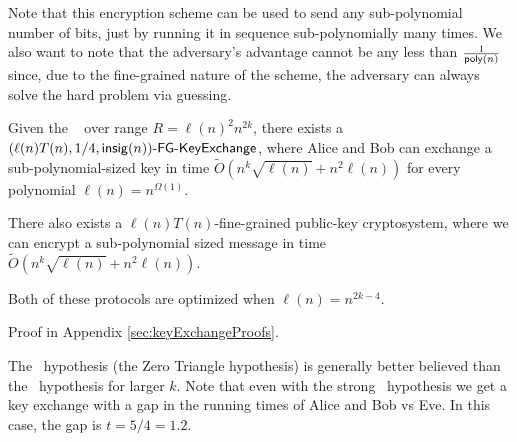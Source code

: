 Note that this encryption scheme can be used to send any sub-polynomial number of bits, just by running it in sequence sub-polynomially many times. %
 We also want to note that the adversary's advantage cannot be any less than $\frac{1}{ \mathsf{poly}(n)}$ since, due to the fine-grained nature of the scheme, the adversary can always solve the hard problem via guessing.


\begin{corollary}
	Given the \strongzkc~ over range $R = \ell(n)^2 n^{2k}$, there exists a\\ $(\ell(n)T(n), 1/4, \mathsf{insig}(n))\textsf{-FG-KeyExchange}$, where Alice and Bob can exchange a sub-polynomial-sized key in time $\tilde{O}\left(n^{k}\sqrt{\ell(n)} + n^2\ell(n)\right)$ for every polynomial $\ell(n)= n ^{\Omega(1)}$.
	
	There also exists a $\ell(n)T(n)$-fine-grained public-key cryptosystem, where we can encrypt a sub-polynomial sized message in time $\tilde{O}\left(n^{k}\sqrt{\ell(n)} + n^2\ell(n)\right)$.
	
	Both of these protocols are optimized when $\ell(n) = n^{2k-4}$.
	\label{cor:kcliqueKeyExchange}
\end{corollary}
Proof in Appendix \ref{sec:keyExchangeProofs}.

The \zThclique~hypothesis (the Zero Triangle hypothesis) is generally better believed than the \zkclique~hypothesis for larger $k$. Note that even with the strong \zThclique~hypothesis we get a key exchange with a gap in the running times of Alice and Bob vs Eve. In this case, the gap is $t = 5/4 = 1.2$.



%


